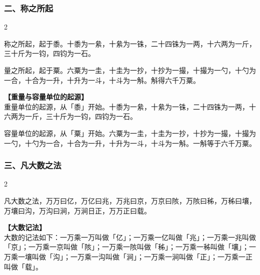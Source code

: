 \documentclass[11pt,a4paper]{article}
\begin{document}
\vspace{0.3cm}

\subsubsection*{二、称之所起}
\begin{paracol}{2}
\begin{problemclassical}
称之所起，起于黍。十黍为一絫，十絫为一铢，二十四铢为一两，十六两为一斤，三十斤为一钧，四钧为一石。

量之所起，起于粟。六粟为一圭，十圭为一抄，十抄为一撮，十撮为一勺，十勺为一合，十合为一升，十升为一斗，十斗为一斛。斛得六千万粟。
\end{problemclassical}
\switchcolumn
\begin{problemmodern}
\textbf{【重量与容量单位的起源】}\\
重量单位的起源，从「黍」开始。十黍为一絫，十絫为一铢，二十四铢为一两，十六两为一斤，三十斤为一钧，四钧为一石。

容量单位的起源，从「粟」开始。六粟为一圭，十圭为一抄，十抄为一撮，十撮为一勺，十勺为一合，十合为一升，十升为一斗，十斗为一斛。一斛等于六千万粟。
\end{problemmodern}
\end{paracol}

\vspace{0.3cm}

\subsubsection*{三、凡大数之法}
\begin{paracol}{2}
\begin{problemclassical}
凡大数之法，万万曰亿，万亿曰兆，万兆曰京，万京曰陔，万陔曰秭，万秭曰壤，万壤曰沟，万沟曰涧，万涧日正，万万正曰载。
\end{problemclassical}
\switchcolumn
\begin{problemmodern}
\textbf{【大数记法】}\\
大数的记法如下：一万乘一万叫做「亿」；一万乘一亿叫做「兆」；一万乘一兆叫做「京」；一万乘一京叫做「陔」；一万乘一陔叫做「秭」；一万乘一秭叫做「壤」；一万乘一壤叫做「沟」；一万乘一沟叫做「涧」；一万乘一涧叫做「正」；一万乘一正叫做「载」。
\end{problemmodern}
\end{paracol}

\vspace{0.3cm}
\end{document}
